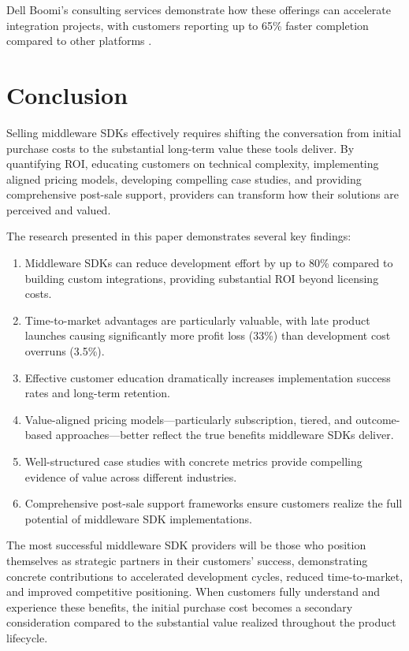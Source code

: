 \documentclass[11pt,a4paper]{article}
\begin{document}
Dell Boomi's consulting services demonstrate how these offerings can accelerate integration projects, with customers reporting up to 65\% faster completion compared to other platforms \cite{multishoring2023}.

\section{Conclusion}

Selling middleware SDKs effectively requires shifting the conversation from initial purchase costs to the substantial long-term value these tools deliver. By quantifying ROI, educating customers on technical complexity, implementing aligned pricing models, developing compelling case studies, and providing comprehensive post-sale support, providers can transform how their solutions are perceived and valued.

The research presented in this paper demonstrates several key findings:

\begin{enumerate}
    \item Middleware SDKs can reduce development effort by up to 80\% compared to building custom integrations, providing substantial ROI beyond licensing costs.
    \item Time-to-market advantages are particularly valuable, with late product launches causing significantly more profit loss (33\%) than development cost overruns (3.5\%).
    \item Effective customer education dramatically increases implementation success rates and long-term retention.
    \item Value-aligned pricing models—particularly subscription, tiered, and outcome-based approaches—better reflect the true benefits middleware SDKs deliver.
    \item Well-structured case studies with concrete metrics provide compelling evidence of value across different industries.
    \item Comprehensive post-sale support frameworks ensure customers realize the full potential of middleware SDK implementations.
\end{enumerate}

The most successful middleware SDK providers will be those who position themselves as strategic partners in their customers' success, demonstrating concrete contributions to accelerated development cycles, reduced time-to-market, and improved competitive positioning. When customers fully understand and experience these benefits, the initial purchase cost becomes a secondary consideration compared to the substantial value realized throughout the product lifecycle.
\end{document}
